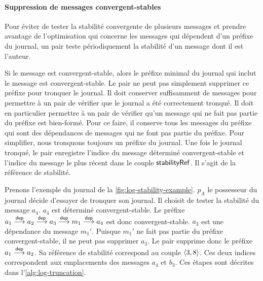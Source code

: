 


\paragraph{Suppression de messages convergent-stables}
Pour éviter de tester la stabilité convergente de plusieurs messages et prendre avantage de l'optimisation qui concerne les messages qui dépendent d'un préfixe du journal, un pair teste périodiquement la stabilité d'un message dont il est l'auteur.

Si le message est convergent-stable, alors le préfixe minimal du journal qui inclut le message est convergent-stable.
Le pair ne peut pas simplement supprimer ce préfixe pour tronquer le journal.
Il doit conserver suffisamment de messages pour permettre à un pair de vérifier que le journal a été correctement tronqué.
Il doit en particulier permettre à un pair de vérifier qu'un message qui ne fait pas partie du préfixe est bien-formé.
Pour ce faire, il conserve tous les messages du préfixe qui sont des dépendances de messages qui ne font pas partie du préfixe.
Pour simplifier, nous tronquons toujours un préfixe du journal.
Une fois le journal tronqué, le pair enregistre l'indice du message déterminé convergent-stable et l'indice du message le plus récent dans le couple $\trm{stabilityRef}$.
Il s'agit de la référence de stabilité.

Prenons l'exemple du journal de la \autoref{fig:log-stability-example}.
$p_A$ le possesseur du journal décide d'essayer de tronquer son journal.
Il choisit de tester la stabilité du message $a_4$.
$a_4$ est déterminé convergent-stable.
Le préfixe $a_1 \dep a_2 \dep a_3 \dep m_1 \dep a_4$ est donc convergent-stable.
$a_3$ est une dépendance du message $m_1'$.
Puisque $m_1'$ ne fait pas partie du préfixe convergent-stable, il ne peut pas supprimer $a_3$.
Le pair supprime donc le préfixe $a_1 \dep a_2$.
Sa référence de stabilité correspond au couple $\tuple*{3, 8}$.
Ces deux indices correspondent aux emplacements des messages $a_4$ et $b_3$.
Ces étapes sont décrites dans l'\autoref{alg:log-truncation}.

